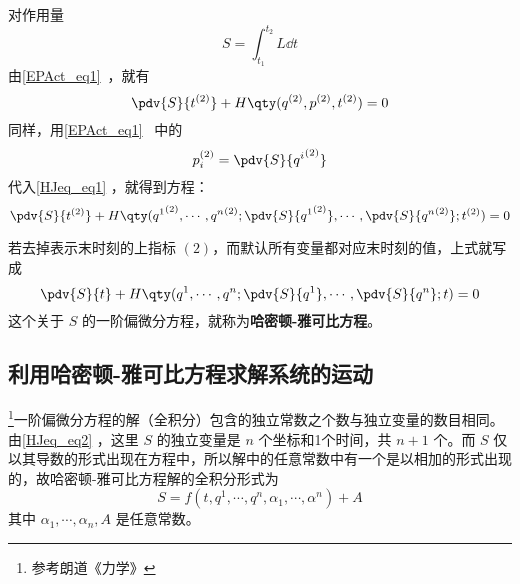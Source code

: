 
对作用量
\begin{equation}
S=\int_{t_1}^{t_2}L\dd t
\end{equation}
由\autoref{EPAct_eq1}~，就有
\begin{equation}\label{HJeq_eq1}
\pdv{S}{t^{(2)}}+H\qty(q^{(2)},p^{(2)},t^{(2)})=0
\end{equation}
同样，用\autoref{EPAct_eq1}~ 中的
\begin{equation}
p_i^{(2)}=\pdv{S}{{q^i}^{(2)}}
\end{equation}
代入\autoref{HJeq_eq1} ，就得到方程：
\begin{equation}
\pdv{S}{t^{(2)}}+H\qty({q^1}^{(2)},\cdots,{q^n}^{(2)};\pdv{S}{{q^1}^{(2)}},\cdots,\pdv{S}{{q^n}^{(2)}};t^{(2)})=0
\end{equation}

若去掉表示末时刻的上指标 $(2)$，而默认所有变量都对应末时刻的值，上式就写成
\begin{equation}\label{HJeq_eq2}
\pdv{S}{t}+H\qty({q^1},\cdots,{q^n};\pdv{S}{{q^1}},\cdots,\pdv{S}{{q^n}};t)=0
\end{equation}
这个关于 $S$ 的一阶偏微分方程，就称为\textbf{哈密顿-雅可比方程}。
\subsection{利用哈密顿-雅可比方程求解系统的运动}
\footnote{参考朗道《力学》}一阶偏微分方程的解（全积分）包含的独立常数之个数与独立变量的数目相同。由\autoref{HJeq_eq2} ，这里 $S$ 的独立变量是 $n$ 个坐标和1个时间，共 $n+1$ 个。而 $S$ 仅以其导数的形式出现在方程中，所以解中的任意常数中有一个是以相加的形式出现的，故哈密顿-雅可比方程解的全积分形式为
\begin{equation}
S=f(t,q^1,\cdots,q^n,\alpha_1,\cdots,\alpha^n)+A
\end{equation}
其中 $\alpha_1,\cdots,\alpha_n,A$ 是任意常数。
